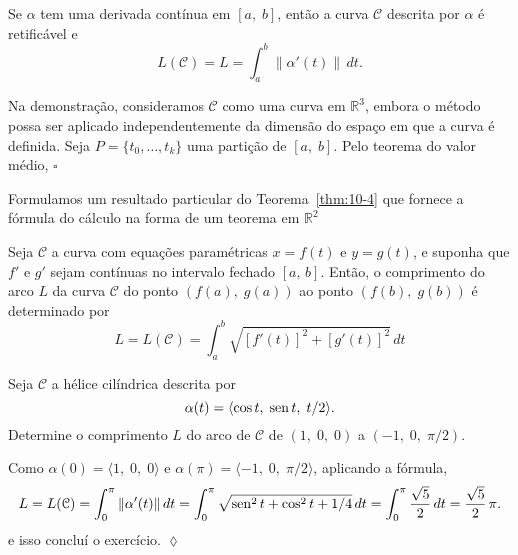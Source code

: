 \begin{teo}\label{thm:10-4}
Se \(\alpha\) tem uma derivada contínua em \([a,\; b]\), então a curva \(\mathcal{C}\) descrita por \(\alpha\) é retificável e
\begin{equation*}
L(\mathcal{C})=L=\int_{a}^{b}\|\alpha'(t)\|\,dt.
\end{equation*}
\end{teo}

\prova 
Na demonstração, consideramos \(\mathcal{C}\) como uma curva em \(\mathbb{R}^{3}\), embora o 
método possa ser aplicado independentemente da dimensão do espaço em que a curva é definida. Seja 
\(P = \{t_{0},\ldots,t_{k}\}\) uma partição de \([a,\; b]\). Pelo teorema do valor médio, 
\hfill \(\square\)

Formulamos um resultado particular do Teorema~\ref{thm:10-4} que fornece a fórmula do cálculo 
na forma de um teorema em \(\mathbb{R}^{2}\)
\begin{framed}
\begin{teo}\label{thm:15-6-3}
Seja  \( \mathcal{C}\) a curva com equações paramétricas \(x = f(t)\) e \(y = g(t)\), e suponha que \(f'\) e \(g'\)
sejam contínuas no intervalo fechado \([a,\, b]\). Então, o comprimento do arco \(L\)  da curva \(\mathcal{C}\) do
ponto \((f(a),\; g(a))\) ao ponto \((f(b),\; g(b))\) é determinado por
\begin{equation*}
\boxed{\quad  L = L(\mathcal{C})= \int_{a}^{b}\sqrt{[f'(t)]^{2}+[g'(t)]^{2}}\, dt \quad}
\end{equation*}
\end{teo}
\end{framed}


\begin{exc}
Seja \(\mathcal{C}\) a hélice cilíndrica descrita por
\begin{equation*}
\alpha(t) =\langle \cos t,\; \operatorname{sen} t, \; t/2\rangle. 
\end{equation*}
Determine o comprimento \(L\) do arco de \(\mathcal{C}\) de \((1,\; 0,\; 0)\) a 
\((-1,\; 0,\; \pi/2)\).
\end{exc}

\solo
Como \(\alpha(0) = \langle 1,\; 0,\; 0\rangle\) e \(\alpha(\pi) = \langle -1,\; 0,\; 
\pi/2\rangle\), aplicando a fórmula,
\begin{equation*}
L=L(\mathcal{C})=\int_{0}^{\pi}\|\alpha'(t)\|\,dt=\int_{0}^{\pi}\sqrt{\operatorname{sen}^{2}t+\cos^{2} t+1/4}\, dt = \int_{0}^{\pi}\dfrac{\sqrt{5}}{2}\,dt= \dfrac{\sqrt{5}}{2}\,\pi.
\end{equation*} 
 e isso concluí o exercício. \hfill \(\lozenge\) 
 
